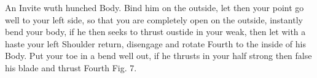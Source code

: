 \exercise{}
An Invite wuth hunched Body. Bind him on the outside, let then your
point go well to your left side, so that you are completely open on
the outside, instantly bend your body, if he then seeks to thrust
oustide in your weak, then let with a haste your left Shoulder return,
disengage and rotate Fourth to the inside of his Body. Put your toe in
a bend well out, if he thrusts in your half strong then
false his blade and thrust Fourth Fig. 7.
